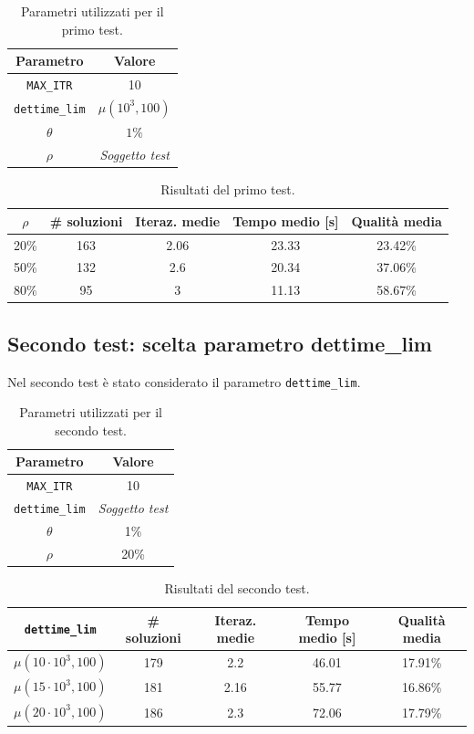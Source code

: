 \begin{table}[ht!]
\centering
\begin{tabular}{cc}
\hline
\textbf{Parametro} & \textbf{Valore} \\
\hline
\verb|MAX_ITR| & 10\\
\verb|dettime_lim| &  $\mu(10^3, 100)$\\
$\theta$ & $1\%$\\
$\rho$ & \emph{Soggetto test}\\
\hline
\end{tabular}
\caption{Parametri utilizzati per il primo test.}
\end{table}

\begin{table}[ht!]
\centering
\begin{tabular}{ccccc}
\hline
$\rho$ & \textbf{\# soluzioni} & \textbf{Iteraz. medie} & \textbf{Tempo medio} [s] & \textbf{Qualità media}\\
\hline
\rowcolor{lightgray} 20\% & 163 & 2.06 & 23.33 & 23.42\% \\
50\% & 132 & 2.6 & 20.34 & 37.06\% \\
80\% & 95 & 3 & 11.13 & 58.67\% \\
\hline
\end{tabular}
\caption{Risultati del primo test.}
\end{table}

\subsection{Secondo test: scelta parametro dettime\texorpdfstring{\_}{}lim}%
\label{sub:Secondo test: scelta parametro dettime-lim}
Nel secondo test è stato considerato il parametro \verb|dettime_lim|.

\begin{table}[ht!]
\centering
\begin{tabular}{cc}
\hline
\textbf{Parametro} & \textbf{Valore} \\
\hline
\verb|MAX_ITR| & 10 \\
\verb|dettime_lim| & \emph{Soggetto test}\\
$\theta$ & 1\%\\
$\rho$ & 20\%\\
\hline
\end{tabular}
\caption{Parametri utilizzati per il secondo test.}
\end{table}

\begin{table}[ht!]
\centering
\begin{tabular}{ccccc}
\hline
\verb|dettime_lim| & \textbf{\# soluzioni} & \textbf{Iteraz. medie} & \textbf{Tempo medio} [s] & \textbf{Qualità media}\\
\hline
$\mu(10 \cdot 10^3, 100)$ & 179 & 2.2 & 46.01 & 17.91\% \\
$\mu(15 \cdot 10^3, 100)$ & 181 & 2.16 & 55.77 & 16.86\% \\
\rowcolor{lightgray} $\mu(20 \cdot 10^3, 100)$ & 186 & 2.3 & 72.06 & 17.79\% \\
\hline
\end{tabular}
\caption{Risultati del secondo test.}
\end{table}

